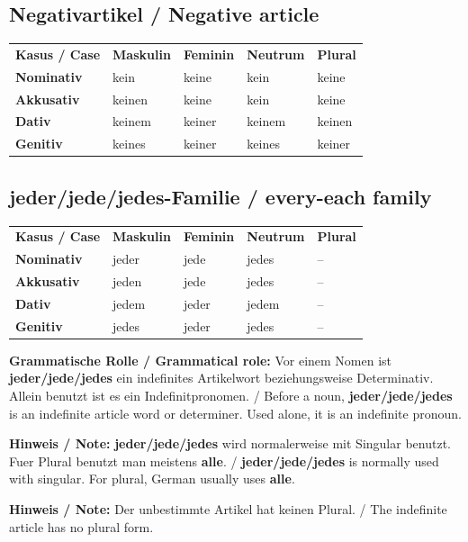 \documentclass[a4paper,10pt]{article}
\newcommand{\TableHeader}[1]{\color{white}\textbf{#1}}
\begin{document}
\subsection{Negativartikel / Negative article}
\begin{tabularx}{\textwidth}{>{\bfseries}p{3.1cm} YYYY}
\TableHeader{Kasus / Case} & \TableHeader{Maskulin} & \TableHeader{Feminin} & \TableHeader{Neutrum} & \TableHeader{Plural} \\
Nominativ & kein & keine & kein & keine \\
Akkusativ & keinen & keine & kein & keine \\
Dativ & keinem & keiner & keinem & keinen \\
Genitiv & keines & keiner & keines & keiner \\
\end{tabularx}



\subsection{jeder/jede/jedes-Familie / every-each family}
\begin{tabularx}{\textwidth}{>{\bfseries}p{3.1cm} YYYY}
\TableHeader{Kasus / Case} & \TableHeader{Maskulin} & \TableHeader{Feminin} & \TableHeader{Neutrum} & \TableHeader{Plural} \\
Nominativ & jeder & jede & jedes & -- \\
Akkusativ & jeden & jede & jedes & -- \\
Dativ & jedem & jeder & jedem & -- \\
Genitiv & jedes & jeder & jedes & -- \\
\end{tabularx}

\vspace{0.35em}
{\small\color{SoftGray}\textbf{Grammatische Rolle / Grammatical role:} Vor einem Nomen ist \textbf{jeder/jede/jedes} ein indefinites Artikelwort beziehungsweise Determinativ. Allein benutzt ist es ein Indefinitpronomen. / Before a noun, \textbf{jeder/jede/jedes} is an indefinite article word or determiner. Used alone, it is an indefinite pronoun.}

\vspace{0.35em}
{\small\color{SoftGray}\textbf{Hinweis / Note:} \textbf{jeder/jede/jedes} wird normalerweise mit Singular benutzt. Fuer Plural benutzt man meistens \textbf{alle}. / \textbf{jeder/jede/jedes} is normally used with singular. For plural, German usually uses \textbf{alle}.}

\vspace{0.5em}
{\small\color{SoftGray}\textbf{Hinweis / Note:} Der unbestimmte Artikel hat keinen Plural. / The indefinite article has no plural form.}
\end{document}
